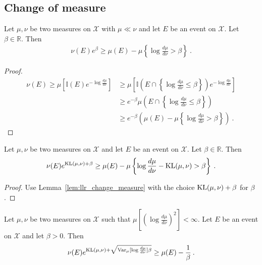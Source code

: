 \subsection{Change of measure}

\begin{lemma}
  \label{lem:llr_change_measure}
  \leanok
  Let $\mu, \nu$ be two measures on $\mathcal X$ with $\mu \ll \nu$ and let $E$ be an event on $\mathcal X$. Let $\beta \in \mathbb{R}$. Then
  \begin{align*}
  \nu(E) e^{\beta} \ge \mu(E) - \mu\left\{ \log\frac{d \mu}{d \nu} > \beta \right\} \: .
  \end{align*}
\end{lemma}

\begin{proof}\leanok
\begin{align*}
\nu(E)
\ge \mu\left[\mathbb{I}(E) e^{- \log\frac{d \mu}{d \nu} }\right]
&\ge \mu\left[\mathbb{I}\left(E \cap \left\{\log\frac{d \mu}{d \nu} \le \beta\right\}\right) e^{- \log\frac{d \mu}{d \nu} }\right]
\\
&\ge e^{- \beta}\mu\left(E \cap \left\{\log\frac{d \mu}{d \nu} \le \beta\right\}\right)
\\
&\ge e^{- \beta}\left( \mu(E) - \mu\left\{ \log\frac{d \mu}{d \nu} > \beta \right\} \right)
\: .
\end{align*}
\end{proof}

\begin{corollary}
  \label{cor:kl_change_measure}
  Let $\mu, \nu$ be two measures on $\mathcal X$ and let $E$ be an event on $\mathcal X$. Let $\beta \in \mathbb{R}$. Then
  \begin{align*}
  \nu(E) e^{\operatorname{KL}(\mu, \nu) + \beta} \ge \mu(E) - \mu\left\{ \log\frac{d \mu}{d \nu} - \operatorname{KL}(\mu, \nu) > \beta \right\} \: .
  \end{align*}
\end{corollary}

\begin{proof}
Use Lemma~\ref{lem:llr_change_measure} with the choice $\operatorname{KL}(\mu, \nu) + \beta$ for $\beta$.
\end{proof}

\begin{lemma}
  \label{lem:llr_change_measure_variance}
  \uses{}
  Let $\mu, \nu$ be two measures on $\mathcal X$ such that $\mu\left[\left(\log\frac{d \mu}{d \nu}\right)^2\right] < \infty$. Let $E$ be an event on $\mathcal X$ and let $\beta > 0$. Then
  \begin{align*}
  \nu(E) e^{\operatorname{KL}(\mu, \nu) + \sqrt{\operatorname{Var}_\mu[\log\frac{d \mu}{d \nu}]\beta}} \ge \mu(E) - \frac{1}{\beta} \: .
  \end{align*}
\end{lemma}

